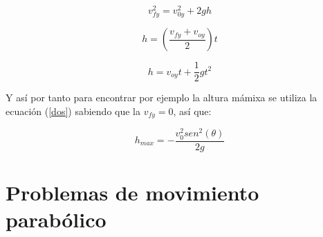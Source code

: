 \documentclass[a5paper,pagesize,10pt,bibtotoc,pointlessnumbers,
normalheadings,DIV=9,fleqn,x11names,table,twoside=false]{scrbook}
\begin{document}
\begin{equation}
 v_{fy}^2 = v_{0y}^2 + 2gh
\end{equation}\label{dos}

\begin{equation}
 h =(\frac{v_{fy}+v_{oy}}{2})t
\end{equation}

\begin{equation}
 h = v_{oy}t + \frac{1}{2}gt^2
\end{equation}

Y así por tanto para encontrar por ejemplo la altura mámixa se utiliza la ecuación (\ref{dos}) sabiendo que la $v_{fy} = 0$, así 
que:

\begin{equation}
 h_{max} = -\frac{v_0^2sen^2(\theta)}{2g}
\end{equation}

\section{Problemas de movimiento parabólico}
\end{document}
